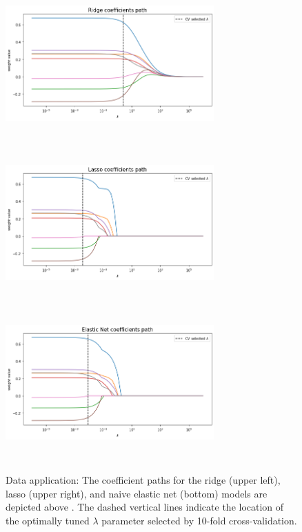 \begin{figure}[H]
\centering
\includegraphics[width=8cm,height=6cm, left]{material/Img/data_ridge_coef_path.png}
\includegraphics[width=8cm,height=6cm, right]{material/Img/data_lasso_coef_path.png}\\
\centering
\includegraphics[width=8cm,height=6cm, center]{material/Img/data_elnet_coef_path.png}\\
\caption[Data application: the coefficients path]{Data application: The coefficient paths for the ridge (upper left), lasso (upper right), and naive elastic net (bottom) models are depicted above . The dashed vertical lines indicate the location of the optimally tuned $\lambda$ parameter selected by 10-fold cross-validation.}
\label{fig:data_coef_path}
\end{figure}

